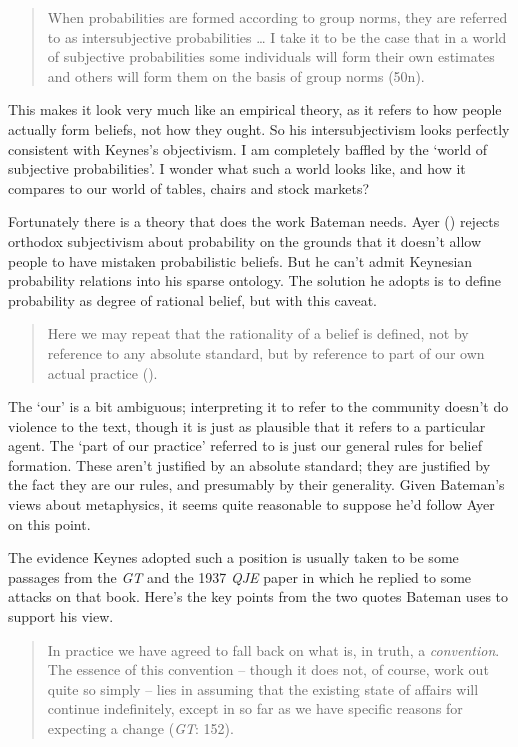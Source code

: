 \documentclass[
  11pt,
  letterpaper,
  DIV=11,
  numbers=noendperiod,
  twoside]{scrartcl}
\begin{document}
\begin{quote}
When probabilities are formed according to group norms, they are
referred to as intersubjective probabilities \ldots{} I take it to be
the case that in a world of subjective probabilities some individuals
will form their own estimates and others will form them on the basis of
group norms (50n).
\end{quote}

This makes it look very much like an empirical theory, as it refers to
how people actually form beliefs, not how they ought. So his
intersubjectivism looks perfectly consistent with Keynes's objectivism.
I am completely baffled by the `world of subjective probabilities'. I
wonder what such a world looks like, and how it compares to our world of
tables, chairs and stock markets?

Fortunately there is a theory that does the work Bateman needs. Ayer
() rejects orthodox subjectivism about
probability on the grounds that it doesn't allow people to have mistaken
probabilistic beliefs. But he can't admit Keynesian probability
relations into his sparse ontology. The solution he adopts is to define
probability as degree of rational belief, but with this caveat.

\begin{quote}
Here we may repeat that the rationality of a belief is defined, not by
reference to any absolute standard, but by reference to part of our own
actual practice ().
\end{quote}

The `our' is a bit ambiguous; interpreting it to refer to the community
doesn't do violence to the text, though it is just as plausible that it
refers to a particular agent. The `part of our practice' referred to is
just our general rules for belief formation. These aren't justified by
an absolute standard; they are justified by the fact they are our rules,
and presumably by their generality. Given Bateman's views about
metaphysics, it seems quite reasonable to suppose he'd follow Ayer on
this point.

The evidence Keynes adopted such a position is usually taken to be some
passages from the \emph{GT} and the 1937 \emph{QJE} paper in which he
replied to some attacks on that book. Here's the key points from the two
quotes Bateman uses to support his view.

\begin{quote}
In practice we have agreed to fall back on what is, in truth, a
\emph{convention}. The essence of this convention -- though it does not,
of course, work out quite so simply -- lies in assuming that the
existing state of affairs will continue indefinitely, except in so far
as we have specific reasons for expecting a change (\emph{GT}: 152).
\end{quote}
\end{document}
